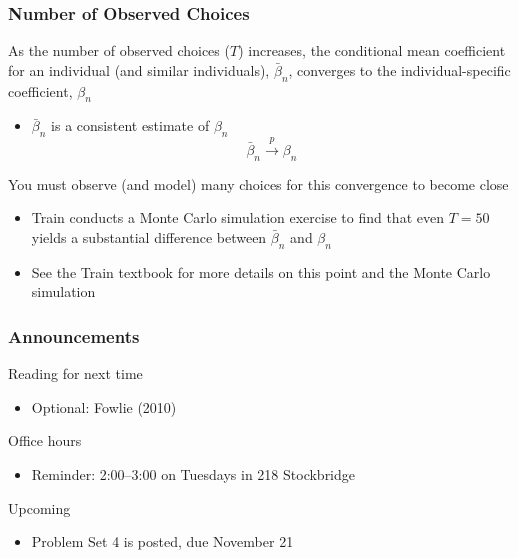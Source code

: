 \documentclass{beamer}
\begin{document}
\begin{frame}\frametitle{Number of Observed Choices}
    As the number of observed choices ($T$) increases, the conditional mean coefficient for an individual (and similar individuals), $\bar{\beta}_n$, converges to the individual-specific coefficient, $\beta_n$
    \begin{itemize}
    	\item $\bar{\beta}_n$ is a consistent estimate of $\beta_n$
    	$$\bar{\beta}_n \overset{p}{\rightarrow} \beta_n$$
    \end{itemize}
    \vspace{3ex}
    You must observe (and model) many choices for this convergence to become close
    \begin{itemize}
    	\item Train conducts a Monte Carlo simulation exercise to find that even $T = 50$ yields a substantial difference between $\bar{\beta}_n$ and $\beta_n$
    	\item See the Train textbook for more details on this point and the Monte Carlo simulation
    \end{itemize}
\end{frame}

\begin{frame}\frametitle{Announcements}
    Reading for next time
    \begin{itemize}
        \item Optional: Fowlie (2010)
    \end{itemize}
    \vspace{3ex}
    Office hours
    \begin{itemize}
    	\item Reminder: 2:00--3:00 on Tuesdays in 218 Stockbridge
    \end{itemize}
    \vspace{3ex}
    Upcoming
    \begin{itemize}
        \item Problem Set 4 is posted, due November 21
    \end{itemize}
\end{frame}
\end{document}
